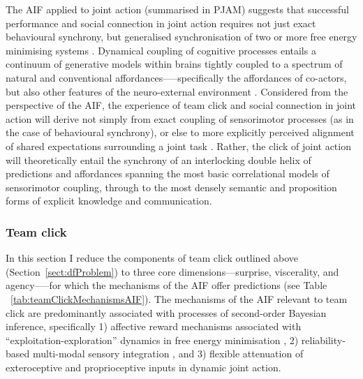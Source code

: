 \begin{CJK}{UTF8}{gbsn}
The AIF applied to joint action (summarised in PJAM) suggests that successful performance and social connection in joint action requires not just exact behavioural synchrony, but generalised synchronisation of two or more free energy minimising systems \citep{Friston2015}.  Dynamical coupling of cognitive processes entails a continuum of generative models within brains tightly coupled to a spectrum of natural and conventional affordances—--specifically the affordances of co-actors, but also other features of the neuro-external environment \citep{Clark2015}.  Considered from the perspective of the AIF, the experience of team click and social connection in joint action will derive not simply from exact coupling of sensorimotor processes (as in the case of behavioural synchrony), or else to more explicitly perceived alignment of shared expectations surrounding a joint task \citep[cf.][]{VanderWel2012}. Rather, the click of joint action will theoretically entail the synchrony of an interlocking double helix of predictions and affordances spanning the most basic correlational models of sensorimotor coupling, through to the most densely semantic and proposition forms of explicit knowledge and communication.


\subsubsection{Team click\label{sect:AIFteamClickJA}}

In this section I reduce the components of team click outlined above (Section~\ref{sect:dfProblem}) to three core dimensions—surprise, viscerality, and agency—--for which the mechanisms of the AIF offer predictions (see Table ~\ref{tab:teamClickMechanismsAIF}).  The mechanisms of the AIF relevant to team click are predominantly associated with processes of second-order Bayesian inference, specifically 1) affective reward mechanisms associated with ``exploitation-exploration'' dynamics in free energy minimisation \citep{Friston2012,Schwartenbeck2013,FitzGerald2014,Chetverikov2016},  2) reliability-based multi-modal sensory integration \citep{Ernst2004}, and 3) flexible attenuation \citep{Frith2007,Friston2015} of exteroceptive and proprioceptive inputs in dynamic joint action.


\end{CJK}
